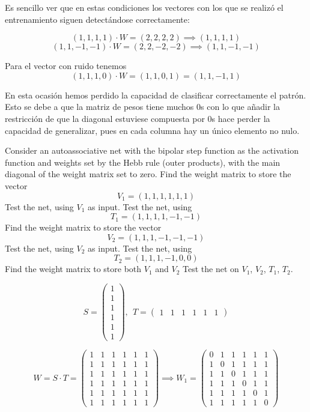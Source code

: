 \begin{problem}[8]
Es sencillo ver que en estas condiciones los vectores con los que se realizó el entrenamiento siguen detectándose correctamente:

\[(1,1,1,1)\cdot W = (2,2,2,2) \implies (1,1,1,1)\]
\[(1,1,-1,-1) \cdot W = (2,2,-2,-2) \implies (1,1,-1,-1)\]

Para el vector con ruido tenemos
\[(1,1,1,0) \cdot W = (1,1,0,1) = (1,1,-1,1)\]

En esta ocasión hemos perdido la capacidad de clasificar correctamente el patrón. Esto se debe a que la matriz de pesos tiene muchos 0s con lo que añadir la restricción de que la diagonal estuviese compuesta por 0s hace perder la capacidad de generalizar, pues en cada columna hay un único elemento no nulo.
\end{problem}

\begin{problem}[9]
Consider an autoassociative net with the bipolar step function as the activation function and weights set by the Hebb rule (outer products), with the main diagonal of the weight matrix set to zero.
\ppart Find the weight matrix to store the vector
\[V_1 = (1, 1, 1, 1,1, 1)\]
\ppart Test the net, using $V_1$ as input.
\ppart Test the net, using
\[T_1 = (1, 1, 1, 1, -1, -1)\]
\ppart Find the weight matrix to store the vector
\[V_2 = (1,1, 1, -1, -1, -1)\]
\ppart Test the net, using $V_2$ as input.
\ppart Test the net, using
\[T_2 = (1, 1, 1, -1,0,0)\]
\ppart Find the weight matrix to store both $V_1$ and $V_2$
\ppart Test the net on $V_1$, $V_2$, $T_1$, $T_2$.

\solution

\spart

\[S = \left( \begin{array}{c}
1 \\
1 \\
1 \\
1 \\
1 \\
1
\end{array}\right), \ \ T = \left( \begin{array}{cccccc}
1 & 1 & 1 & 1 & 1 & 1
\end{array}\right)\]

\[W = S\cdot T = \left( \begin{array}{cccccc}
1 & 1 & 1 & 1 & 1 & 1 \\
1 & 1 & 1 & 1 & 1 & 1 \\
1 & 1 & 1 & 1 & 1 & 1 \\
1 & 1 & 1 & 1 & 1 & 1 \\
1 & 1 & 1 & 1 & 1 & 1 \\
1 & 1 & 1 & 1 & 1 & 1
\end{array}\right) \implies W_1 = \left( \begin{array}{cccccc}
0 & 1 & 1 & 1 & 1 & 1 \\
1 & 0 & 1 & 1 & 1 & 1 \\
1 & 1 & 0 & 1 & 1 & 1 \\
1 & 1 & 1 & 0 & 1 & 1 \\
1 & 1 & 1 & 1 & 0 & 1 \\
1 & 1 & 1 & 1 & 1 & 0
\end{array}\right) \]


\end{problem}
